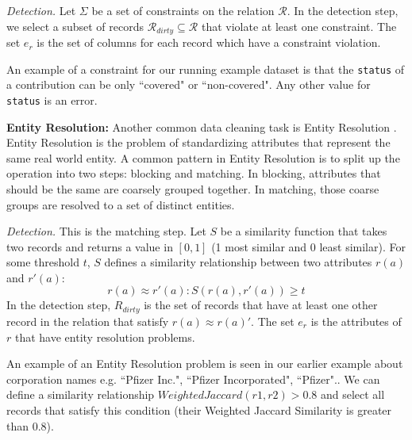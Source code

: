 \vspace{0.5em}

\emph{Detection. } Let $\Sigma$ be a set of constraints on the relation $\mathcal{R}$. 
In the detection step, we select a subset of records $\mathcal{R}_{dirty} \subseteq \mathcal{R}$ that violate at least one constraint.
The set $e_r$ is the set of columns for each record which have a constraint violation. 

\begin{example}
An example of a constraint for our running example dataset is that the \texttt{status} of
a contribution can be only ``covered" or ``non-covered".
Any other value for \texttt{status} is an error.
\end{example}

\vspace{0.5em}

\noindent\textbf{Entity Resolution: }
Another common data cleaning task is Entity Resolution \cite{gokhale2014corleone, DBLP:journals/pvldb/KopckeTR10, wang2012crowder}.
Entity Resolution is the problem of standardizing attributes that represent the same real world entity.
A common pattern in Entity Resolution is to split up the operation into two steps: blocking and matching.
In blocking, attributes that should be the same are coarsely grouped together.
In matching, those coarse groups are resolved to a set of distinct entities.

\vspace{0.5em}

\emph{Detection. } This is the matching step. Let $S$ be a similarity function that takes two records and returns a value in $[0,1]$ (1 most similar and 0 least similar). For some threshold $t$, $S$ defines a similarity relationship between two attributes $r(a)$ and $r'(a)$:
\[
r(a) \approx r'(a) : S(r(a),r'(a)) \ge t
\] 
In the detection step, $R_{dirty}$ is the set of records that have at least one other record in the relation that satisfy $r(a) \approx r(a)'$.
The set $e_r$ is the attributes of $r$ that have entity resolution problems.

\begin{example}
An example of an Entity Resolution problem is seen in our earlier example about corporation names e.g. ``Pfizer Inc.", ``Pfizer Incorporated", ``Pfizer".. 
We can define a similarity relationship $WeightedJaccard(r1,r2)>0.8$ and select all records that satisfy this condition (their Weighted Jaccard Similarity is greater than 0.8).
\end{example}

